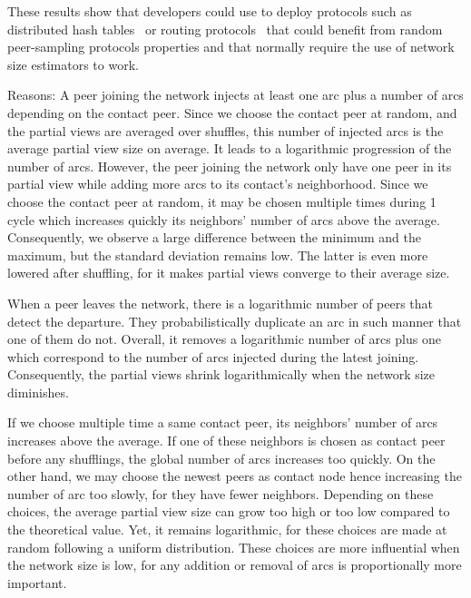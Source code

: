 \begin{asparadesc}
  These results show that developers could use \SPRAY to deploy protocols such
  as distributed hash tables~\cite{camarillo2014self} or routing
  protocols~\cite{kleinberg2000smallworld} that could benefit from random
  peer-sampling protocols properties and that normally require the use of
  network size estimators to work.


\item [Reasons:] A peer joining the network injects at least one arc plus a
  number of arcs depending on the contact peer. Since we choose the contact peer
  at random, and the partial views are averaged over shuffles, this number of
  injected arcs is the average partial view size on average. It leads to a
  logarithmic progression of the number of arcs. However, the peer joining the
  network only have one peer in its partial view while adding more arcs to its
  contact's neighborhood. Since we choose the contact peer at random, it may be
  chosen multiple times during 1 cycle which increases quickly its neighbors'
  number of arcs above the average. Consequently, we observe a large difference
  between the minimum and the maximum, but the standard deviation remains
  low. The latter is even more lowered after shuffling, for it makes partial
  views converge to their average size. 

  When a peer leaves the network, there is a logarithmic number of peers that
  detect the departure. They probabilistically duplicate an arc in such manner
  that one of them do not. Overall, it removes a logarithmic number of arcs plus
  one which correspond to the number of arcs injected during the latest
  joining. Consequently, the partial views shrink logarithmically when the
  network size diminishes.

  If we choose multiple time a same contact peer, its neighbors' number of arcs
  increases above the average. If one of these neighbors is chosen as contact
  peer before any shufflings, the global number of arcs increases too
  quickly. On the other hand, we may choose the newest peers as contact node
  hence increasing the number of arc too slowly, for they have fewer
  neighbors. Depending on these choices, the average partial view size can grow
  too high or too low compared to the theoretical value. Yet, it remains
  logarithmic, for these choices are made at random following a uniform
  distribution. These choices are more influential when the network size is low,
  for any addition or removal of arcs is proportionally more important.
\end{asparadesc}

